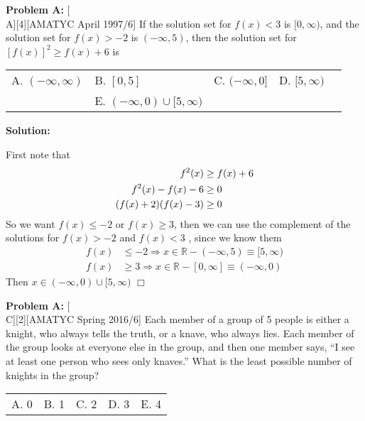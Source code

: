 \documentclass[12pt]{article}
\makeatletter
\newcounter{problem}
\newenvironment{problem}[1]{%
    \stepcounter{problem}
    \noindent\textbf{Problem A\theproblem:} #1
    \\[1em]
}{}
\newcommand{\multChoice}[5]{%
    \begin{tabular}{l @{\hskip 1.5cm} l @{\hskip 1.5cm} l @{\hskip 1.5cm} l @{\hskip 1.5cm} l}
    A. #1 & B. #2 & C. #3 & D. #4 & E. #5
    \end{tabular}
}
\newenvironment{solution}{%
    \vspace{1em}
    \noindent\textbf{Solution:} 
}{}
\makeatother
\begin{document}
\begin{problem}[A][4][AMATYC April 1997/6]
   If the solution set for $f(x) < 3$ is $[0,\infty)$, and the solution set for $f(x) > -2$ is $(-\infty, 5)$, then the solution set for $[f(x)]^2 \geq f(x) + 6$ is
\end{problem}

\multChoice{$(-\infty,\infty)$}{$[0,5]$}{$(-\infty,0]$}{$[5,\infty)$ \\}
{$(-\infty,0) \cup [5,\infty)$}

\begin{solution}
   First note that
\begin{align*} \setcounter{equation}{0}
    f^2(x) &\geq f(x)+6\\
    f^2(x)-f(x)-6 &\geq 0 \\
    (f(x)+2)(f(x)-3) &\geq 0
   \end{align*}
   So we want $f(x) \leq -2$ or $f(x) \geq 3$, then we can use the complement of the solutions for $f(x) > -2$ and $f(x)<3$ , since we know them
   \begin{align*}
      f(x) &\leq -2 \Rightarrow x \in \mathbb{R} - (-\infty,5) \equiv [5,\infty) \\
      f(x) &\geq 3 \Rightarrow x \in \mathbb{R} - [0,\infty] \equiv (-\infty,0)
   \end{align*}
   Then $x \in (-\infty,0) \cup [5,\infty)$  $\Box$
\end{solution}

\begin{problem}[C][2][AMATYC Spring 2016/6]
   Each member of a group of 5 people is either a knight, who always tells the truth, or a knave, who always lies. Each member of the group looks at everyone else in the group, and then one member says, “I see at least one person who sees only knaves.” What is the least possible number of knights in the group?  
\end{problem}
\multChoice{0}{1}{2}{3}{4}
\end{document}
